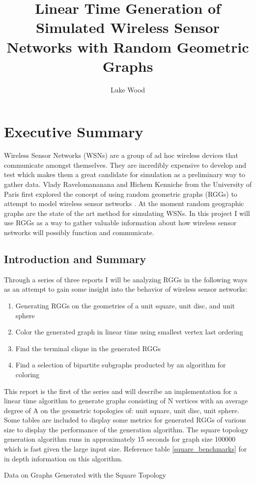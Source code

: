 \documentclass{article}
\begin{document}
  \title{Linear Time Generation of Simulated Wireless Sensor Networks with Random Geometric Graphs}
  \author{Luke Wood}
  \maketitle

  \section{Executive Summary}
	Wireless Sensor Networks (WSNs) are a group of ad hoc wireless devices that communicate amongst themselves.
	They are incredibly expensive to develop and test which makes them a great candidate for simulation as a preliminary way to gather data.
	Vlady Ravelomananana and Hichem Kenniche from the University of Paris first explored the concept of using random geometric graphs (RGGs) to attempt to model wireless sensor networks \cite{kenniche2010random}.
  At the moment random geographic graphs are the state of the art method for simulating WSNs.
	In this project I will use RGGs as a way to gather valuable information about how wireless sensor networks will possibly function and communicate.

  \subsection{Introduction and Summary}
	Through a series of three reports	I will be analyzing RGGs in the following ways as an attempt to gain some insight into the behavior of wireless sensor networks:
	\begin{enumerate}
		\item Generating RGGs on the geometries of a unit square, unit disc, and unit sphere
		\item Color the generated graph in linear time using smallest vertex last ordering
		\item Find the terminal clique in the generated RGGs
		\item Find a selection of bipartite subgraphs producted by an algorithm for coloring
	\end{enumerate}
	This report is the first of the series and will describe an implementation for a linear time algorithm to generate graphs consisting of N vertices with an average degree of A on the geometric topologies of: unit square, unit disc, unit sphere.
	Some tables are included to display some metrics for generated  RGGs of various size to display the performance of the generation algorithm.
	The square topology generation algorithm runs in approximately 15 seconds for graph size 100000 which is fast given the large input size.
  Reference table \ref{square_benchmarks} for in depth information on this algorithm.
	\begin{center}
	  \begin{table}
      \label{square_benchmarks}
			\caption{Data on Graphs Generated with the Square Topology}
		\end{table}
	\end{center}
\end{document}

